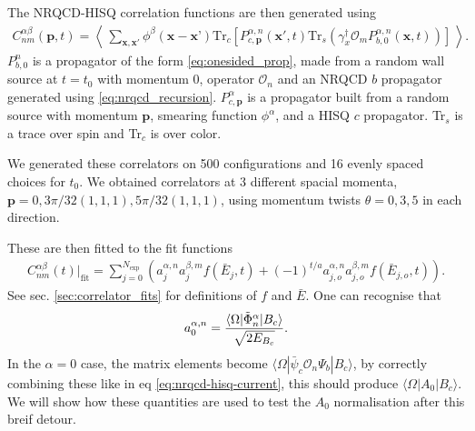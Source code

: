 The NRQCD-HISQ correlation functions are then generated using
\begin{align}
  C_{nm}^{\alpha \beta}({\textbf{p}},t) = \left\langle\, \sum_{\textbf{x},\textbf{x}'} \phi^{\beta}({\textbf{x}-\textbf{x'}})\text{Tr}_c \left[  P^{\alpha,n}_{c,{\textbf{p}}}({\textbf{x}}',t) \text{Tr}_s\left( \gamma_x^{\dagger} \mathcal{O}_m P^{\alpha,n}_{b,0}({\textbf{x}},t) \right) \right]  \,\right\rangle.
  \label{eq:nrqcd-hisq-2pt}
\end{align}
$P^{n}_{b,0}$ is a propagator of the form \eqref{eq:onesided_prop}, made from a random wall source at $t=t_0$ with momentum $0$, operator $\mathcal{O}_n$ and an NRQCD $b$ propagator generated using \eqref{eq:nrqcd_recursion}. $P^{\alpha}_{c,{\textbf{p}}}$ is a propagator built from a random source with momentum ${\textbf{p}}$, smearing function $\phi^{\alpha}$, and a HISQ $c$ propagator. Tr$_s$ is a trace over spin and Tr$_c$ is over color.

We generated these correlators on 500 configurations and 16 evenly spaced choices for $t_0$. We obtained correlators at 3 different spacial momenta, $\textbf{p} = 0, 3\pi/32(1,1,1), 5\pi/32(1,1,1)$, using momentum twists $\theta=0,3,5$ in each direction.

These are then fitted to the fit functions 
\begin{align}
  C^{\alpha\beta}_{nm}(t)|_{\text{fit}} = \sum_{j=0}^{N_{\text{exp}}} \left( a^{\alpha,n}_j a^{\beta,m}_j f(\bar{E}_j,t) + (-1)^{t/a} a^{\alpha,n}_{j,o} a^{\beta,m}_{j,o} f(\bar{E}_{j,o},t) \right).
  \label{eq:2ptfit_wsmears}
\end{align}
See sec. \ref{sec:correlator_fits} for definitions of $f$ and $\bar{E}$. One can recognise that
\begin{align}
  a_0^{\alpha,n} = {\langle \Omega | \tilde{\Phi}^{\alpha}_n | B_c \rangle \over \sqrt{2 E_{B_c}}}.
\end{align}
In the $\alpha=0$ case, the matrix elements become $\langle \Omega | \bar{\psi}_c \mathcal{O}_n \Psi_b | B_c \rangle$, by correctly combining these like in eq \eqref{eq:nrqcd-hisq-current}, this should produce $\langle \Omega | A_0 | B_c \rangle$. We will show how these quantities are used to test the $A_0$ normalisation after this breif detour.

